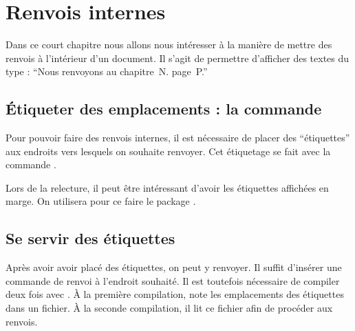 \chapter{Renvois internes}\label{label}

\begin{intro}
Dans ce court chapitre nous allons nous intéresser à la manière de mettre des renvois à l'intérieur d'un document.
Il s'agit de permettre d'afficher des textes du type : \enquote{Nous renvoyons au chapitre~N. page~P.}
\end{intro}

\section{Étiqueter des  emplacements : la commande }

Pour pouvoir faire des renvois internes, il est nécessaire de placer des \enquote{étiquettes} aux endroits vers lesquels on souhaite renvoyer.
Cet étiquetage  se fait avec la commande .

\begin{plusloins}
Lors de la relecture, il peut être intéressant d'avoir les étiquettes affichées en marge. On utilisera pour ce faire le package .
\end{plusloins}

\section{Se servir des étiquettes}

Après avoir avoir placé des étiquettes, on peut y renvoyer. 
Il suffit d'insérer une commande de renvoi à l'endroit souhaité. 
Il est toutefois nécessaire de compiler deux fois avec \XeLaTeX.
À la première compilation,   \XeLaTeX
note les emplacements des étiquettes dans un fichier. À la seconde compilation, il lit ce fichier afin de procéder aux renvois. 

